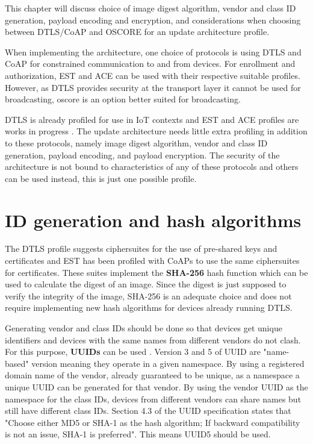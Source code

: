 \documentclass[0-thesis.tex]{subfiles}
\begin{document}
\label{chap:profiles}
This chapter will discuss choice of image digest algorithm, vendor and class ID
generation, payload encoding and encryption, and considerations when choosing between
DTLS/CoAP and OSCORE for an update architecture profile.

When implementing the architecture, one choice of protocols is using DTLS and CoAP for
constrained communication to and from devices. For enrollment and authorization, EST and
ACE can be used with their respective suitable profiles. However, as DTLS provides
security at the transport layer it cannot be used for broadcasting, \gls{oscore} is an
option better suited for broadcasting. 

DTLS is already profiled for use in IoT contexts and EST and ACE profiles are works in
progress \parencite{rfc7925, est-coaps, ace-dtls-profile}. The update architecture needs
little extra profiling in addition to these protocols, namely image digest algorithm,
vendor and class ID generation, payload encoding, and payload encryption. The security of
the architecture is not bound to characteristics of any of these protocols and others can
be used instead, this is just one possible profile.

\section{ID generation and hash algorithms}
\label{sec:hash-id-algorithm}
The DTLS profile suggests ciphersuites for the use of pre-shared keys and certificates and
EST has been profiled with CoAPs to use the same ciphersuites for certificates. These
suites implement the \textbf{SHA-256} hash function which can be used to calculate the
digest of an image. Since the digest is just supposed to verify the integrity of the
image, SHA-256 is an adequate choice and does not require implementing new hash algorithms
for devices already running DTLS.

Generating vendor and class IDs should be done so that devices get unique identifiers and
devices with the same names from different vendors do not clash. For this purpose,
\textbf{UUIDs} can be used \parencite{rfc4122}. Version 3 and 5 of UUID are "name-based"
version meaning they operate in a given namespace. By using a registered domain name of
the vendor, already guaranteed to be unique, as a namespace a unique UUID can be generated
for that vendor. By using the vendor UUID as the namespace for the class IDs, devices from
different vendors can share names but still have different class IDs. Section 4.3 of the
UUID specification states that "Choose either MD5 or SHA-1 as the hash algorithm; If
backward compatibility is not an issue, SHA-1 is preferred". This means UUID5 should be
used.
\end{document}
